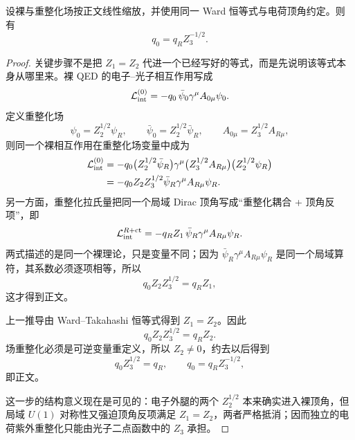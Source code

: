 \begin{proposition}[规范协变的电荷重整化关系]
设裸与重整化场按正文线性缩放，并使用同一 Ward 恒等式与电荷顶角约定。则有
\begin{equation}
{q_0=q_RZ_3^{-1/2}.}
\label{eq:qed-charge-Z3-dp53}
\end{equation}
\end{proposition}
\begin{proof}
关键步骤不是把 \(Z_1=Z_2\) 代进一个已经写好的等式，而是先说明该等式本身从哪里来。裸 QED 的电子--光子相互作用写成
\begin{equation*}
\mathcal L_{\rm int}^{(0)}
=-q_0\,\bar\psi_0\gamma^\mu A_{0\mu}\psi_0.
\end{equation*}
定义重整化场
\begin{equation*}
\psi_0=Z_2^{1/2}\psi_R,
\qquad
\bar\psi_0=Z_2^{1/2}\bar\psi_R,
\qquad
A_{0\mu}=Z_3^{1/2}A_{R\mu},
\end{equation*}
则同一个裸相互作用在重整化场变量中成为
\begin{align*}
\mathcal L_{\rm int}^{(0)}
&=-q_0
\bigl(Z_2^{1/2}\bar\psi_R\bigr)
\gamma^\mu
\bigl(Z_3^{1/2}A_{R\mu}\bigr)
\bigl(Z_2^{1/2}\psi_R\bigr)\\
&=-q_0Z_2Z_3^{1/2}
\bar\psi_R\gamma^\mu A_{R\mu}\psi_R.
\end{align*}
另一方面，重整化拉氏量把同一个局域 Dirac 顶角写成“重整化耦合 + 顶角反项”，即
\begin{equation*}
\mathcal L_{\rm int}^{R+\rm ct}
=-q_R Z_1\,
\bar\psi_R\gamma^\mu A_{R\mu}\psi_R.
\end{equation*}
两式描述的是同一个裸理论，只是变量不同；因为
\(\bar\psi_R\gamma^\mu A_{R\mu}\psi_R\)
是同一个局域算符，其系数必须逐项相等，所以
\begin{equation*}
q_0Z_2Z_3^{1/2}=q_RZ_1,
\end{equation*}
这才得到正文。

上一推导由 Ward--Takahashi 恒等式得到 \(Z_1=Z_2\)。因此
\begin{equation*}
q_0Z_2Z_3^{1/2}=q_RZ_2.
\end{equation*}
场重整化必须是可逆变量重定义，所以 \(Z_2\neq0\)，约去以后得到
\begin{equation*}
q_0Z_3^{1/2}=q_R,
\qquad
q_0=q_RZ_3^{-1/2},
\end{equation*}
即正文。

这一步的结构意义现在是可见的：电子外腿的两个 \(Z_2^{1/2}\) 本来确实进入裸顶角，但局域 \(U(1)\) 对称性又强迫顶角反项满足 \(Z_1=Z_2\)，两者严格抵消；因而独立的电荷紫外重整化只能由光子二点函数中的 \(Z_3\) 承担。
\end{proof}

